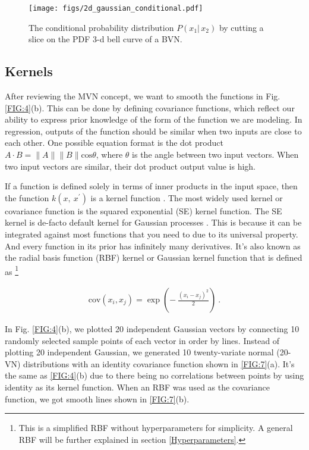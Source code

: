 \documentclass[preprint,12pt]{elsarticle}
\begin{document}
\begin{figure}[h!]
	\centering
	\texttt{[image: figs/2d\_gaussian\_conditional.pdf]}
	\caption{The conditional probability distribution $P(x_1 \vert \, x_2)$ by cutting a slice on the PDF 3-d bell curve of a BVN.}
	\label{FIG:6}
\end{figure}

\subsection{Kernels}

After reviewing the MVN concept, we want to smooth the functions in Fig. \ref{FIG:4}(b). This can be done by defining covariance functions, which reflect our ability to express prior knowledge of the form of the function we are modeling. In regression, outputs of the function should be similar when two inputs are close to each other. One possible equation format is the dot product $A \cdot B = \lVert A \rVert \lVert B \rVert \text{cos}\theta$, where $\theta$ is the angle between two input vectors. When two input vectors are similar, their dot product output value is high. 

If a function is defined solely in terms of inner products in the input space, then the function $k(x,\ x^\prime)$ is a kernel function \cite{Rasmussen2006}. The most widely used kernel or covariance function is the squared exponential (SE) kernel function. The SE kernel is de-facto default kernel for Gaussian processes \cite{duvenaud2014automatic}. This is because it can be integrated against most functions that you need to due to its universal property. And every function in its prior has infinitely many derivatives. It's also known as the radial basis function (RBF) kernel or Gaussian kernel function that is defined as \footnote{This is a simplified RBF without hyperparameters for simplicity. A general RBF will be further explained in section \ref{Hyperparameters}.} 
\begin{ceqn}
    \begin{align}
       \text{cov}(x_i, x_j)=\exp\left(-~\frac{(x_i-x_j)^2}{2}\right) \ . \nonumber
    \end{align}
\end{ceqn}

In Fig. \ref{FIG:4}(b), we plotted 20 independent Gaussian vectors by connecting 10 randomly selected sample points of each vector in order by lines. Instead of plotting 20 independent Gaussian, we generated 10 twenty-variate normal (20-VN) distributions with an identity covariance function shown in \ref{FIG:7}(a). It's the same as \ref{FIG:4}(b) due to there being no correlations between points by using identity as its kernel function. When an RBF was used as the covariance function, we got smooth lines shown in \ref{FIG:7}(b).
\end{document}
